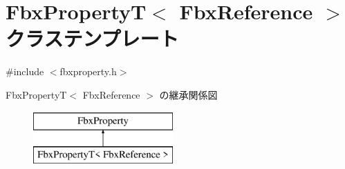 \hypertarget{class_fbx_property_t_3_01_fbx_reference_01_4}{}\section{Fbx\+PropertyT$<$ Fbx\+Reference $>$ クラステンプレート}
\label{class_fbx_property_t_3_01_fbx_reference_01_4}


{\ttfamily \#include $<$fbxproperty.\+h$>$}

Fbx\+PropertyT$<$ Fbx\+Reference $>$ の継承関係図\begin{figure}[H]
\begin{center}
\leavevmode
\includegraphics[height=2.000000cm]{class_fbx_property_t_3_01_fbx_reference_01_4}
\end{center}
\end{figure}

